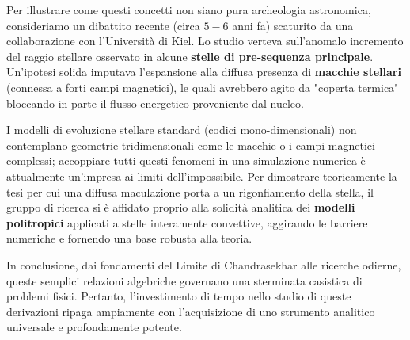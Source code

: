 Per illustrare come questi concetti non siano pura archeologia astronomica, consideriamo un dibattito recente (circa $5-6$ anni fa) scaturito da una collaborazione con l'Università di Kiel.
Lo studio verteva sull'anomalo incremento del raggio stellare osservato in alcune \textbf{stelle di pre-sequenza principale}. Un'ipotesi solida imputava l'espansione alla diffusa presenza di \textbf{macchie stellari} (connessa a forti campi magnetici), le quali avrebbero agito da "coperta termica" bloccando in parte il flusso energetico proveniente dal nucleo.

I modelli di evoluzione stellare standard (codici mono-dimensionali) non contemplano geometrie tridimensionali come le macchie o i campi magnetici complessi; accoppiare tutti questi fenomeni in una simulazione numerica è attualmente un'impresa ai limiti dell'impossibile.
Per dimostrare teoricamente la tesi per cui una diffusa maculazione porta a un rigonfiamento della stella, il gruppo di ricerca si è affidato proprio alla solidità analitica dei \textbf{modelli politropici} applicati a stelle interamente convettive, aggirando le barriere numeriche e fornendo una base robusta alla teoria.

In conclusione, dai fondamenti del Limite di Chandrasekhar alle ricerche odierne, queste semplici relazioni algebriche governano una sterminata casistica di problemi fisici. Pertanto, l'investimento di tempo nello studio di queste derivazioni ripaga ampiamente con l'acquisizione di uno strumento analitico universale e profondamente potente.